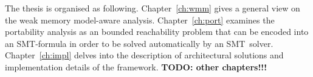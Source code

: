 The thesis is organised as following.
Chapter~\ref{ch:wmm} gives a general view on the weak memory model-aware analysis.
Chapter~\ref{ch:port} examines the portability analysis as an bounded reachability problem that can be encoded into an SMT-formula in order to be solved automatically by an SMT~solver.
Chapter~\ref{ch:impl} delves into the description of architectural solutions and implementation details of the \porthos[2] framework.
\textbf{TODO: other chapters!!!}


